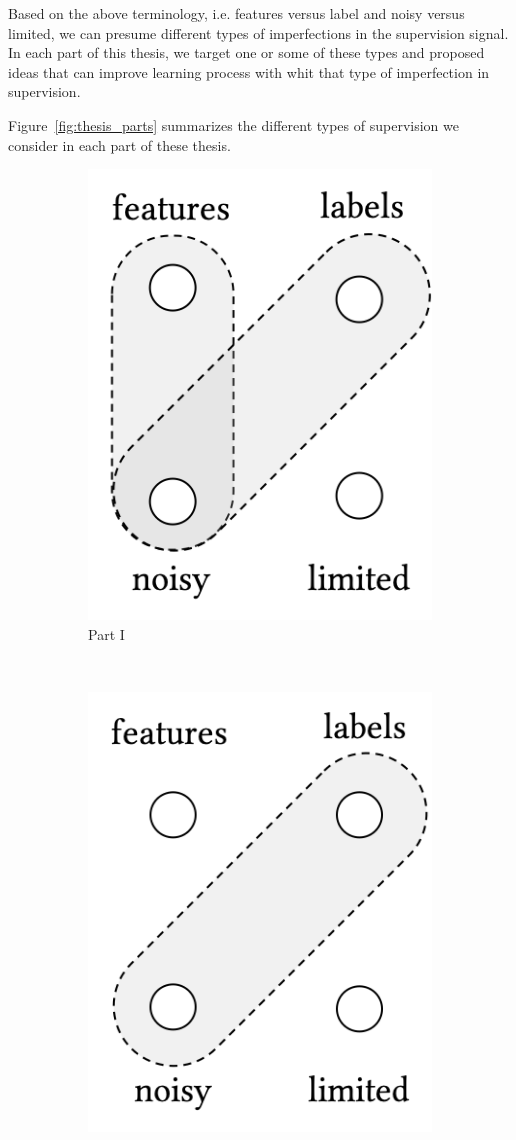 Based on the above terminology, i.e. features versus label and noisy versus limited, we can presume different types of imperfections in the supervision signal. In each part of this thesis, we target one or some of these types and proposed ideas that can improve learning process with whit that type of imperfection in supervision. 

Figure~\ref{fig:thesis_parts} summarizes the different types of supervision we consider in each part of these thesis.
\begin{figure}[t]
    \centering
    \begin{subfigure}[b]{0.32\textwidth}
    \centering
        \includegraphics[width=0.55\linewidth]{01-introduction/figs_and_tables/fig_p1.png}
        \caption{\label{fig:p1}Part I}
    \end{subfigure}
        ~ 
    \begin{subfigure}[b]{0.32\textwidth}
    \centering
        \includegraphics[width=0.55\linewidth]{01-introduction/figs_and_tables/fig_p2.png}

\end{subfigure}
\end{figure}
